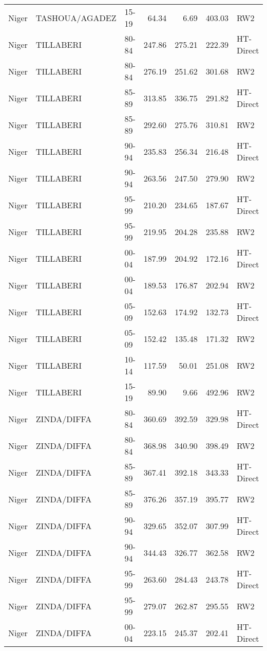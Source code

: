 \begin{longtable}{lllrrrl}
  Niger & TASHOUA/AGADEZ & 15-19 & 64.34 & 6.69 & 403.03 & RW2 \\ 
  Niger & TILLABERI & 80-84 & 247.86 & 275.21 & 222.39 & HT-Direct \\ 
  Niger & TILLABERI & 80-84 & 276.19 & 251.62 & 301.68 & RW2 \\ 
  Niger & TILLABERI & 85-89 & 313.85 & 336.75 & 291.82 & HT-Direct \\ 
  Niger & TILLABERI & 85-89 & 292.60 & 275.76 & 310.81 & RW2 \\ 
  Niger & TILLABERI & 90-94 & 235.83 & 256.34 & 216.48 & HT-Direct \\ 
  Niger & TILLABERI & 90-94 & 263.56 & 247.50 & 279.90 & RW2 \\ 
  Niger & TILLABERI & 95-99 & 210.20 & 234.65 & 187.67 & HT-Direct \\ 
  Niger & TILLABERI & 95-99 & 219.95 & 204.28 & 235.88 & RW2 \\ 
  Niger & TILLABERI & 00-04 & 187.99 & 204.92 & 172.16 & HT-Direct \\ 
  Niger & TILLABERI & 00-04 & 189.53 & 176.87 & 202.94 & RW2 \\ 
  Niger & TILLABERI & 05-09 & 152.63 & 174.92 & 132.73 & HT-Direct \\ 
  Niger & TILLABERI & 05-09 & 152.42 & 135.48 & 171.32 & RW2 \\ 
  Niger & TILLABERI & 10-14 & 117.59 & 50.01 & 251.08 & RW2 \\ 
  Niger & TILLABERI & 15-19 & 89.90 & 9.66 & 492.96 & RW2 \\ 
  Niger & ZINDA/DIFFA & 80-84 & 360.69 & 392.59 & 329.98 & HT-Direct \\ 
  Niger & ZINDA/DIFFA & 80-84 & 368.98 & 340.90 & 398.49 & RW2 \\ 
  Niger & ZINDA/DIFFA & 85-89 & 367.41 & 392.18 & 343.33 & HT-Direct \\ 
  Niger & ZINDA/DIFFA & 85-89 & 376.26 & 357.19 & 395.77 & RW2 \\ 
  Niger & ZINDA/DIFFA & 90-94 & 329.65 & 352.07 & 307.99 & HT-Direct \\ 
  Niger & ZINDA/DIFFA & 90-94 & 344.43 & 326.77 & 362.58 & RW2 \\ 
  Niger & ZINDA/DIFFA & 95-99 & 263.60 & 284.43 & 243.78 & HT-Direct \\ 
  Niger & ZINDA/DIFFA & 95-99 & 279.07 & 262.87 & 295.55 & RW2 \\ 
  Niger & ZINDA/DIFFA & 00-04 & 223.15 & 245.37 & 202.41 & HT-Direct \\ 

\end{longtable}
